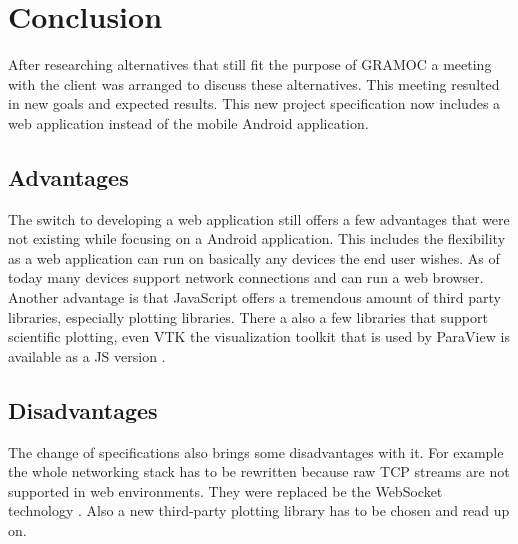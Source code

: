 \chapter{Conclusion}

\author{Nico Kratky}
%
After researching alternatives that still fit the purpose of GRAMOC a meeting with the client was arranged to discuss these alternatives. This meeting resulted in new goals and expected results. This new project specification now includes a web application instead of the mobile Android application.

\section{Advantages}
The switch to developing a web application still offers a few advantages that were not existing while focusing on a Android application. This includes the flexibility as a web application can run on basically any devices the end user wishes. As of today many devices support network connections and can run a web browser. Another advantage is that JavaScript offers a tremendous amount of third party libraries, especially plotting libraries. There a also a few libraries that support scientific plotting, even VTK the visualization toolkit that is used by ParaView is available as a JS version \cite{VTK}.

\section{Disadvantages}
The change of specifications also brings some disadvantages with it. For example the whole networking stack has to be rewritten because raw TCP streams are not supported in web environments. They were replaced be the WebSocket technology \cite{rfc6455}. Also a new third-party plotting library has to be chosen and read up on.
